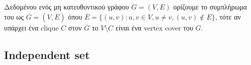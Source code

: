 Δεδομένου ενός μη κατευθυντικού γράφου $G=(V,E)$ ορίζουμε το συμπλήρωμα του ως $\overline{G} = (V, \overline{E})$ όπου $\overline{E} = \{(u,v):u,v \in{V}, u \neq v, (u,v) \notin{E}\}$, τότε αν υπάρχει ένα clique $C$ στον $\overline{G}$ το $V \setminus C$ είναι ένα vertex cover του $G$.

\subsection{Independent set}
